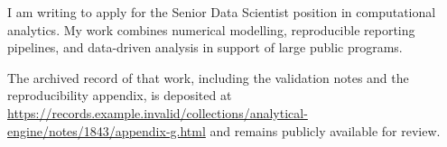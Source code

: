 \documentclass{careerdossier-letter}
\begin{document}
\MakeCDossierLetterhead

I am writing to apply for the Senior Data Scientist position in computational
analytics. My work combines numerical modelling, reproducible reporting
pipelines, and data-driven analysis in support of large public programs.

The archived record of that work, including the validation notes and the
reproducibility appendix, is deposited at
\url{https://records.example.invalid/collections/analytical-engine/notes/1843/appendix-g.html}
and remains publicly available for review.

\MakeCDossierClosing
\end{document}
